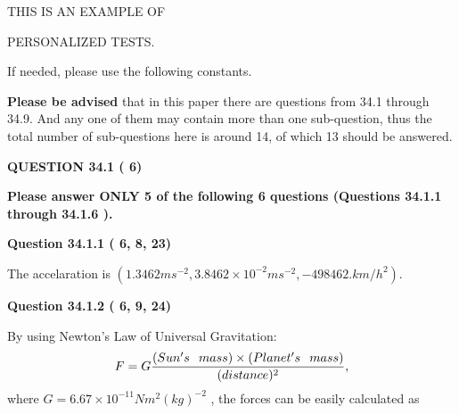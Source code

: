 \documentclass[12pt]{article}
\begin{document}
   
   
   
   
   
 \vspace{0.2in}
 
 
{\Huge  THIS IS AN EXAMPLE OF}
 
{\Huge  PERSONALIZED TESTS. }
 
If needed, please use the following constants.
 
 
 
{\textbf{\large{Please be advised}}} that in this paper there are questions from
34.1 through
34.9.
And any one of them may contain more than one sub-question, thus the total number
of sub-questions here is around 14, of which
13 should be answered.
 
\vspace{0.3in}
 
 
   
   
  
\vspace{0.2in}
  
{\textbf{\Large{QUESTION
34.1 
 (          6)
}}}
  
  
{\textbf{\Large{Please answer ONLY  %
           5 %
 of the following  %
           6 %
 questions (Questions  %
34.1.1 %
 through  %
34.1.6 %
 ). }}}
   
   
  
\vspace{0.2in}
  
{\textbf{\Large{Question
34.1.1 
 (          6,          8,         23)
}}}
  
  
 
 
\noindent{}
 
 
The accelaration is
$(
1.3462ms^{-2},
3.8462 \times 10^{-2}ms^{-2},
-498462.km/h^2
).
$
 
 
 
 
  
\vspace{0.2in}
  
{\textbf{\Large{Question
34.1.2 
 (          6,          9,         24)
}}}
  
  
 
 
\noindent{}

By using Newton's Law of Universal Gravitation:
\[
F=G \frac{(Sun's \hspace{0.1in} mass) \times (Planet's \hspace{0.1in} mass)} { (distance)^2},
\]
where
$ G= %
6.67 \times 10^{-11} N m^{2}(kg)^{-2}$ , the forces can be easily calculated as
 
\end{document}
